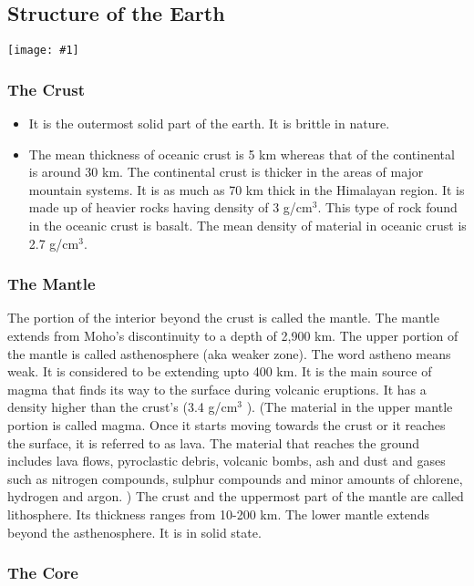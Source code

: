 \documentclass[8pt, a4paper, oneside, twocolumn]{extarticle}
\newcommand{\ph}[1]{
    \texttt{[image: \#1]}
}
\begin{document}
\subsection{Structure of the Earth}

\ph{earth}

\subsubsection{The Crust}

\begin{itemize}
\item It is the outermost solid part of the earth. It is brittle in nature. 
\item The mean thickness of oceanic crust is 5 km whereas that of the continental is around 30 km. The continental crust is thicker in the areas of major mountain systems. It is as much as 70 km thick in the Himalayan region. It is made up of heavier rocks having density of 3 g/cm$^3$. This type of rock found in the oceanic crust is basalt. The mean density of material in oceanic crust is 2.7 g/cm$^3$.
\end{itemize}
\subsubsection{The Mantle}
The portion of the interior beyond the crust is called the mantle. The mantle extends from Moho’s discontinuity to a depth of 2,900 km. The upper portion of the mantle is called asthenosphere (aka weaker zone). The word astheno means weak. It is considered to be extending upto 400 km. It is the main source of magma that finds its way to the surface during volcanic eruptions. It has a density higher than the crust’s (3.4 g/cm$^3$ ). (The material in the upper mantle portion is called magma. Once it starts moving towards the crust or it reaches the surface, it is referred to as lava. The material that reaches the ground includes lava flows, pyroclastic debris, volcanic bombs, ash and dust and gases such as nitrogen compounds, sulphur compounds and minor amounts of chlorene, hydrogen and argon. ) The crust and the uppermost part of the mantle are called lithosphere. Its thickness ranges from 10-200 km. The lower mantle extends beyond the asthenosphere. It is in solid state.

\subsubsection{The Core}
\end{document}

